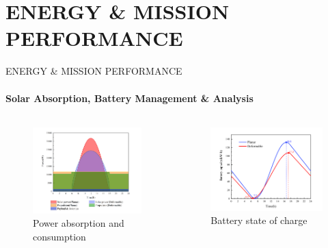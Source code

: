 \documentclass{beamer}
\begin{document}
\section{ENERGY \& MISSION PERFORMANCE}
\begin{frame}{ENERGY \& MISSION PERFORMANCE}
    \framesubtitle{Solar Absorption, Battery Management \& Analysis}
    
    \begin{columns}
        \begin{column}{0.5\textwidth}
            \begin{figure}
                \centering
                \includegraphics[width=\textwidth]{power_curve.png}
                \caption{Power absorption and consumption}
            \end{figure}
        \end{column}
        \begin{column}{0.5\textwidth}
            \begin{figure}
                \centering
                \includegraphics[width=\textwidth]{soc_curve.png}
                \caption{Battery state of charge}
            \end{figure}
        \end{column}
    \end{columns}


\end{frame}
\end{document}

